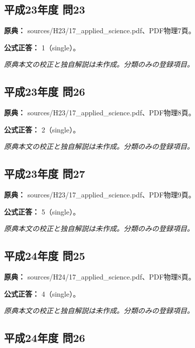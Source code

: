 \subsection{平成23年度 問23}
\label{q:h23-reg-applied-23}

\noindent\textbf{原典：} sources/H23/17\_applied\_science.pdf、PDF物理7頁。

\textbf{公式正答：} 1（single）。

\par\textit{原典本文の校正と独自解説は未作成。分類のみの登録項目。}

\subsection{平成23年度 問26}
\label{q:h23-reg-applied-26}

\noindent\textbf{原典：} sources/H23/17\_applied\_science.pdf、PDF物理8頁。

\textbf{公式正答：} 2（single）。

\par\textit{原典本文の校正と独自解説は未作成。分類のみの登録項目。}

\subsection{平成23年度 問27}
\label{q:h23-reg-applied-27}

\noindent\textbf{原典：} sources/H23/17\_applied\_science.pdf、PDF物理9頁。

\textbf{公式正答：} 5（single）。

\par\textit{原典本文の校正と独自解説は未作成。分類のみの登録項目。}

\subsection{平成24年度 問25}
\label{q:h24-reg-applied-25}

\noindent\textbf{原典：} sources/H24/17\_applied\_science.pdf、PDF物理8頁。

\textbf{公式正答：} 4（single）。

\par\textit{原典本文の校正と独自解説は未作成。分類のみの登録項目。}

\subsection{平成24年度 問26}
\label{q:h24-reg-applied-26}

